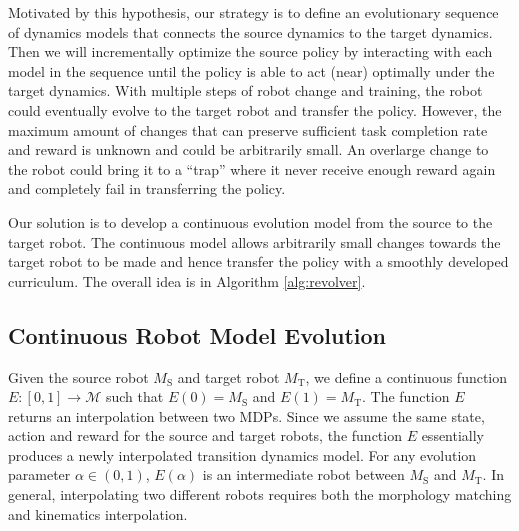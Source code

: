 \documentclass[nohyperref]{article}
\theoremstyle{plain}
\theoremstyle{definition}
\theoremstyle{remark}
\begin{document}
Motivated by this hypothesis, our strategy is to define an evolutionary sequence of dynamics models that connects the source dynamics to the target dynamics. 
Then we will incrementally optimize the source policy by interacting with each model in the sequence until the policy is able to act (near) optimally under the target dynamics.
With multiple steps of robot change and training, the robot could eventually evolve to the target robot and transfer the policy.
However, the maximum amount of changes that can preserve sufficient task completion rate and reward is unknown and could be arbitrarily small.
An overlarge change to the robot could bring it to a ``trap'' where it never receive enough reward again and completely fail in transferring the policy.



Our solution is to develop a continuous evolution model from the source to the target robot.
The continuous model allows arbitrarily small changes towards the target robot to be made and hence transfer the policy with a smoothly developed curriculum.
The overall idea is in Algorithm \ref{alg:revolver}.

\subsection{Continuous Robot Model Evolution}

Given the source robot $M_{\text{S}}$ and target robot $M_{\text{T}}$, we define a continuous function $E: [0,1]\rightarrow \mathcal{M}$ such that $E(0) = M_{\text{S}}$ and $E(1) = M_{\text{T}}$.
The function $E$ returns an interpolation between two MDPs.
Since we assume the same state, action and reward for the source and target robots, the function $E$ essentially produces a newly interpolated transition dynamics model.
For any evolution parameter $\alpha \in (0,1)$, $E(\alpha)$ is an intermediate robot between $M_{\text{S}}$ and $M_{\text{T}}$.
In general, interpolating two different robots requires both the morphology matching and kinematics interpolation.
\end{document}
